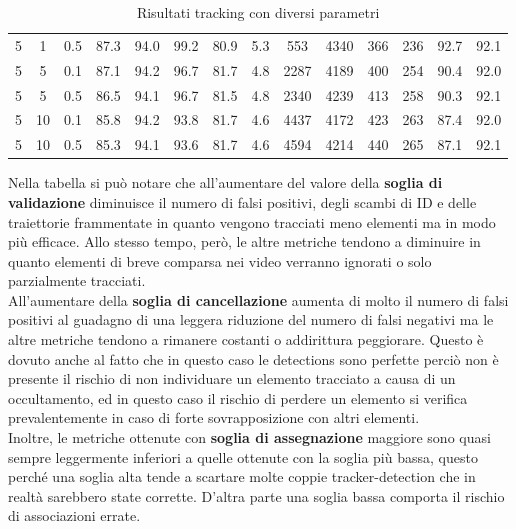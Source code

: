 \begin{table}[h!]
\begin{tabular}{|c|c|c|c|c|c|c|c|c|c|c|c|c|c|}
5 & 1 & 0.5 & 87.3 & 94.0 & 99.2 & 80.9 & 5.3 & 553 & 4340 & 366 & 236 & 92.7 & 92.1\\
5 & 5 & 0.1 & 87.1 & 94.2 & 96.7 & 81.7 & 4.8 & 2287 & 4189 & 400 & 254 & 90.4 & 92.0\\
5 & 5 & 0.5 & 86.5 & 94.1 & 96.7 & 81.5 & 4.8 & 2340 & 4239 & 413 & 258 & 90.3 & 92.1\\
5 & 10 & 0.1 & 85.8 & 94.2 & 93.8 & 81.7 & 4.6 & 4437 & 4172 & 423 & 263 & 87.4 & 92.0\\
5 & 10 & 0.5 & 85.3 & 94.1 & 93.6 & 81.7 & 4.6 & 4594 & 4214 & 440 & 265 & 87.1 & 92.1\\
\hline
\end{tabular}
\caption{Risultati tracking con diversi parametri}
\label{risultati tracking con diversi parametri}
\end{table}

Nella tabella si può notare che all'aumentare del valore della \textbf{soglia di validazione} diminuisce il numero di falsi positivi, degli scambi di ID e delle traiettorie frammentate in quanto vengono tracciati meno elementi ma in modo più efficace. Allo stesso tempo, però, le altre metriche tendono a diminuire in quanto elementi di breve comparsa nei video verranno ignorati o solo parzialmente tracciati.\\
All'aumentare della \textbf{soglia di cancellazione} aumenta di molto il numero di falsi positivi al guadagno di una leggera riduzione del numero di falsi negativi ma le altre metriche tendono a rimanere costanti o addirittura peggiorare. Questo è dovuto anche al fatto che in questo caso le detections sono perfette perciò non è presente il rischio di non individuare un elemento tracciato a causa di un occultamento, ed in questo caso il rischio di perdere un elemento si verifica prevalentemente in caso di forte sovrapposizione con altri elementi.\\
Inoltre, le metriche ottenute con \textbf{soglia di assegnazione} maggiore sono quasi sempre leggermente inferiori a quelle ottenute con la soglia più bassa, questo perché una soglia alta tende a scartare molte coppie tracker-detection che in realtà sarebbero state corrette. D'altra parte una soglia bassa comporta il rischio di associazioni errate.

\clearpage
